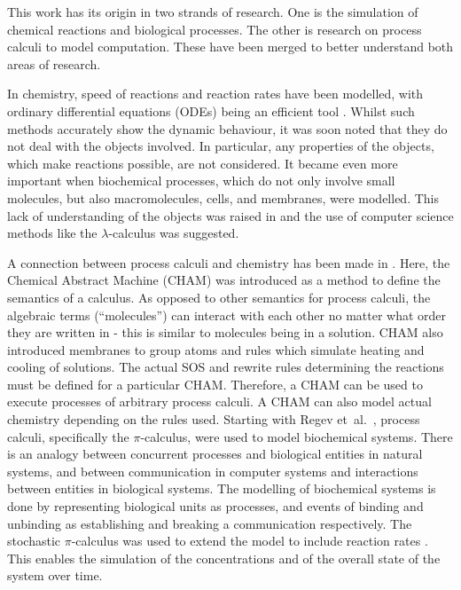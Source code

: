 This work has its origin in two strands of research. One is the simulation of chemical reactions and biological processes. The other is research on process calculi to model computation. These have been merged  to better understand both areas of research. 

In chemistry, speed of reactions and reaction rates have been modelled, with ordinary differential equations (ODEs) being an efficient tool \cite{higham}. Whilst such methods accurately show the dynamic behaviour, it was soon noted that they do not deal with the objects involved. In particular, any properties of the objects, which make reactions possible, are not considered. 
It became even more important when biochemical processes, which do not only involve small molecules, but also macromolecules, cells, and membranes, were modelled. This lack of understanding of the objects was raised in \cite{fontana} and the use of computer science methods like the $\lambda$-calculus was suggested. 

A connection between process calculi and chemistry has been made in \cite{chamjournal}. Here, the Chemical Abstract Machine (CHAM) was introduced as a method to define the semantics of a calculus. As opposed to other semantics for process calculi, the algebraic terms (``molecules'') can interact with each other no matter what order they are written in - this is similar to molecules being in a solution. CHAM also introduced membranes to group atoms and rules which simulate heating and cooling of solutions. The actual SOS and rewrite rules determining the reactions must be defined for a particular CHAM. Therefore, a CHAM can be used to execute processes of arbitrary process calculi. A CHAM can also model actual chemistry depending on the rules used. Starting with Regev et~al.~\cite{regev2000}, process calculi, specifically the $\pi$-calculus, were used to model biochemical systems. There is an analogy between concurrent processes and biological entities in natural systems, and between communication in computer systems and interactions between entities in biological systems. The modelling of biochemical systems is done by representing biological units as processes, and events of binding and unbinding as establishing and breaking a communication respectively. %
The stochastic $\pi$-calculus \cite{PriamiStochasticPi} was used to extend the model to include reaction rates \cite{PriameRegev}. This enables the simulation of the concentrations and of the overall state of the system over time. 

